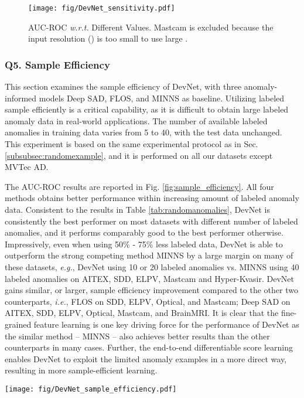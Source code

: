 \documentclass[10pt,journal,compsoc]{IEEEtran}
\newcommand{\eg}{\textit{e.g.}}
\newcommand{\ie}{\textit{i.e.}}
\begin{document}
\begin{figure}[h!]
  \centering
    \texttt{[image: fig/DevNet\_sensitivity.pdf]}
  \caption{AUC-ROC \textit{w.r.t.} Different  Values. Mastcam is excluded because the input resolution () is too small to use large .}
  \label{fig:robustness_K}
\end{figure}



\subsubsection{Q5. Sample Efficiency}\label{exp:labeledanomalies}
This section examines the sample efficiency of DevNet, with three anomaly-informed models Deep SAD, FLOS, and MINNS as baseline. Utilizing labeled sample efficiently is a critical capability,  as it is difficult to obtain large labeled anomaly data in real-world applications. The number of available labeled anomalies in training data varies from 5 to 40, with the test data unchanged. This experiment is based on the same experimental protocol as in Sec. \ref{subsubsec:randomexample}, and it is performed on all our datasets except MVTec AD. 

The AUC-ROC results are reported in Fig. \ref{fig:sample_efficiency}. All four methods obtains better performance within increasing amount of labeled anomaly data. Consistent to the results in Table \ref{tab:randomanomalies}, DevNet is consistently the best performer on most datasets with different number of labeled anomalies, and it performs comparably good to the best performer otherwise. Impressively, even when using 50\% - 75\% less labeled data, DevNet is able to outperform the strong competing method MINNS by a large margin on many of these datasets, \eg, DevNet using 10 or 20 labeled anomalies vs. MINNS using 40 labeled anomalies on AITEX, SDD, ELPV, Mastcam and Hyper-Kvasir. DevNet gains similar, or larger, sample efficiency improvement compared to the other two counterparts, \ie, FLOS on SDD, ELPV, Optical, and Mastcam; Deep SAD on AITEX, SDD, ELPV, Optical, Mastcam, and BrainMRI. It is clear that the fine-grained feature learning is one key driving force for the performance of DevNet as the similar method -- MINNS -- also achieves better results than the other counterparts in many cases. Further, the end-to-end differentiable score learning enables DevNet to exploit the limited anomaly examples in a more direct way, resulting in more sample-efficient learning.

\begin{figure*}[h!]
  \centering
    \texttt{[image: fig/DevNet\_sample\_efficiency.pdf]}
  \caption{AUC-ROC Performance \textit{w.r.t.} Different Number of Labeled Anomaly Examples Used.}
  \label{fig:sample_efficiency}
\end{figure*}
\end{document}
